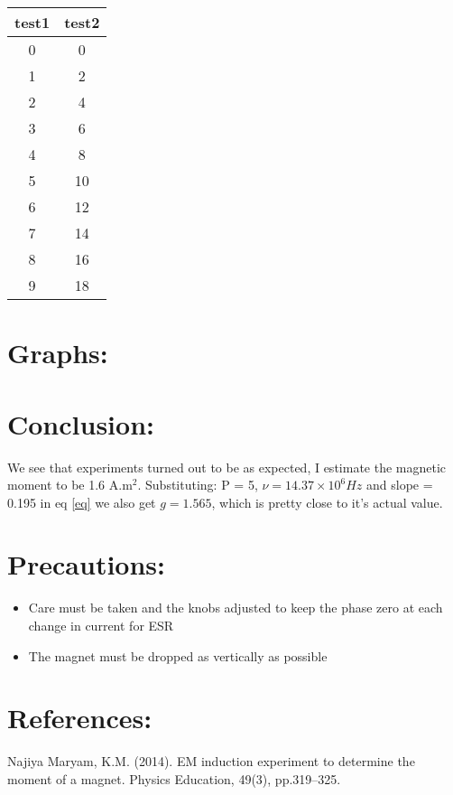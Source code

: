 \documentclass{../_layouts/ieeeconf}
\begin{document}
\begin{table}[H]
    \centering
    \begin{tabular}{@{}cc@{}}
        \toprule
        ﻿test1 & test2 \\
        \midrule
        0 & 0 \\
        1 & 2 \\
        2 & 4 \\
        3 & 6 \\
        4 & 8 \\
        5 & 10 \\
        6 & 12 \\
        7 & 14 \\
        8 & 16 \\
        9 & 18 \\
        \bottomrule
    \end{tabular}
\end{table}
\section{Graphs:}
\section{Conclusion:}
We see that experiments turned out to be as expected, I estimate the
magnetic moment to be 1.6 A.m\(^2\). Substituting: P = 5,
\(\nu = 14.37 \times 10^6 Hz\) and slope = 0.195 in eq \ref{eq} we also
get \(g = 1.565\), which is pretty close to it's actual value.

\section{Precautions:}
\begin{itemize}
\tightlist
\item
  Care must be taken and the knobs adjusted to keep the phase zero at
  each change in current for ESR
\item
  The magnet must be dropped as vertically as possible
\end{itemize}

\section{References:}
Najiya Maryam, K.M. (2014). EM induction experiment to determine the
moment of a magnet. Physics Education, 49(3), pp.319--325.
\end{document}
